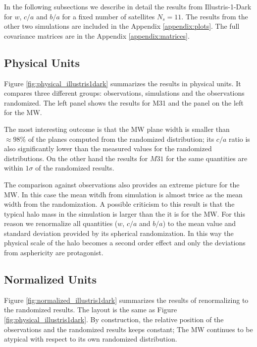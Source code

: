 \documentclass[a4paper,fleqn,usenatbib]{mnras}
\begin{document}
In the following subsections we describe in detail the results from
Illustris-1-Dark for $w$, $c/a$ and $b/a$ for a fixed number of
satellites $N_s=11$.
The results from the other two simulations are included in the
Appendix \ref{appendix:plots}. 
The full covariance matrices are in the Appendix
\ref{appendix:matrices}. 


\subsection{Physical Units}



Figure \ref{fig:physical_illustris1dark} summarizes the results in
physical units.
It compares three different groups: observations, simulations and the
observations randomized.
The left panel shows the results for M31 and the panel on the left for
the MW.

The most interesting outcome is that the MW plane width is smaller
than $\approx 98\%$ of the planes computed from the randomized distribution;
its  $c/a$ ratio is also significantly lower than the measured values for
the randomized distributions.   
On the other hand the results for $M31$ for the same quantities are
within $1\sigma$ of the randomized results.

The comparison against observations also provides an extreme picture
for the MW. 
In this case the mean witdh from simulation is almost twice as the
mean width from the randomization. 
A possible criticism to this result is that the typical halo mass in
the simulation is larger than the it is for the MW. 
For this reason we renormalize all quantities ($w$, $c/a$ and $b/a$)
to the mean value and standard deviation provided by its spherical
randomization. 
In this way the physical scale of the halo becomes a second order
effect and only the deviations from asphericity are protagonist.


\subsection{Normalized Units}

Figure \ref{fig:normalized_illustris1dark} summarizes  the results of
renormalizing to the randomized results.
The layout is the same as Figure \ref{fig:physical_illustris1dark}.
By construction, the relative position of the observations and the
randomized results keeps constant; The MW continues to be atypical
with respect to its own randomized distribution.
\end{document}
